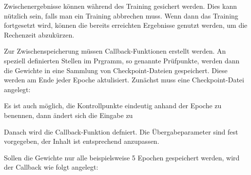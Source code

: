Zwischenergebnisse können während des Training gesichert werden. Dies kann nützlich sein, falls man ein Training abbrechen muss. Wenn dann das Training fortgesetzt wird, können die bereits erreichten Ergebnisse genutzt werden, um die Rechenzeit abzukürzen.

Zur Zwischenspeicherung müssen Callback-Funktionen erstellt werden. An speziell definierten Stellen im Prgramm, so genannte Prüfpunkte, werden dann die Gewichte in eine Sammlung von Checkpoint-Dateien gespeichert. Diese werden am Ende jeder Epoche aktulisiert. Zunächst muss eine Checkpoint-Datei angelegt:

\medskip




\medskip

Es ist auch möglich, die Kontrollpunkte eindeutig anhand der Epoche zu benennen, dann ändert sich die Eingabe zu


\medskip




\medskip

Danach wird die Callback-Funktion defniert. Die Übergabeparameter sind fest vorgegeben, der Inhalt ist entsprechend anzupassen.

\medskip






\medskip

Sollen die Gewichte nur alle beispielsweise 5 Epochen gespeichert werden, wird der Callback wie folgt angelegt:

\medskip


